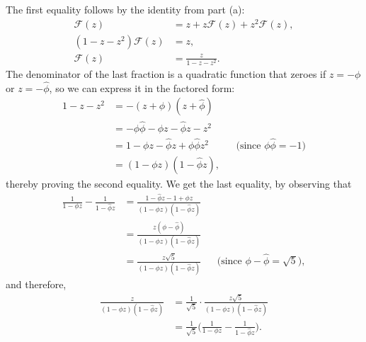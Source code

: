 The first equality follows by the identity from part (a):
\begin{align*}
    \mathcal{F}(z) &= z+z\mathcal{F}(z)+z^2\mathcal{F}(z), \\
    (1-z-z^2)\mathcal{F}(z) &= z, \\
    \mathcal{F}(z) &= \frac{z}{1-z-z^2}.
\end{align*}
The denominator of the last fraction is a quadratic function that zeroes if $z=-\phi$ or $z=-\widehat\phi$, so we can express it in the factored form:
\begin{align*}
    1-z-z^2 &= -(z+\phi)(z+\widehat\phi) \\
    &= -\phi\widehat\phi-\phi z-\widehat\phi z-z^2 \\
    &= 1-\phi z-\widehat\phi z+\phi\widehat\phi z^2 && \text{(since $\phi\widehat\phi=-1$)} \\
    &= (1-\phi z)(1-\widehat\phi z),
\end{align*}
thereby proving the second equality.
We get the last equality, by observing that
\begin{align*}
    \frac{1}{1-\phi z}-\frac{1}{1-\widehat\phi z} &= \frac{1-\widehat\phi z-1+\phi z}{(1-\phi z)(1-\widehat\phi z)} \\[1mm]
    &= \frac{z(\phi-\widehat\phi)}{(1-\phi z)(1-\widehat\phi z)} \\[1mm]
    &= \frac{z\sqrt{5}}{(1-\phi z)(1-\widehat\phi z)} && \text{(since $\phi-\widehat\phi=\sqrt{5}$)},
\end{align*}
and therefore,
\begin{align*}
    \frac{z}{(1-\phi z)(1-\widehat\phi z)} &= \frac{1}{\sqrt{5}}\cdot\frac{z\sqrt{5}}{(1-\phi z)(1-\widehat\phi z)} \\[1mm]
    &= \frac{1}{\sqrt{5}}\biggl(\frac{1}{1-\phi z}-\frac{1}{1-\widehat\phi z}\biggr).
\end{align*}
